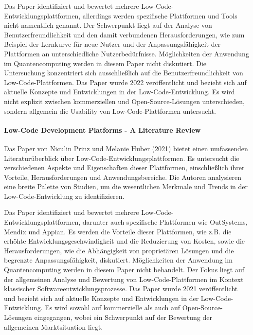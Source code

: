Das Paper identifiziert und bewertet mehrere Low-Code-Entwicklungsplattformen, allerdings werden spezifische Plattformen 
und Tools nicht namentlich genannt. Der Schwerpunkt liegt auf der Analyse von Benutzerfreundlichkeit und den damit 
verbundenen Herausforderungen, wie zum Beispiel der Lernkurve für neue Nutzer und der Anpassungsfähigkeit der 
Plattformen an unterschiedliche Nutzerbedürfnisse. 
Möglichkeiten der Anwendung im Quantencomputing werden in diesem Paper nicht diskutiert. 
Die Untersuchung konzentriert sich ausschließlich auf die Benutzerfreundlichkeit von Low-Code-Plattformen. 
Das Paper wurde 2022 veröffentlicht und bezieht sich auf aktuelle Konzepte und Entwicklungen in der Low-Code-Entwicklung. 
Es wird nicht explizit zwischen kommerziellen und Open-Source-Lösungen unterschieden, 
sondern allgemein die Usability von Low-Code-Plattformen untersucht.

\paragraph{Low-Code Development Platforms - A Literature Review}

Das Paper von Niculin Prinz und Melanie Huber (2021) bietet einen umfassenden Literaturüberblick über Low-Code-Entwicklungsplattformen. 
Es untersucht die verschiedenen Aspekte und Eigenschaften dieser Plattformen, einschließlich ihrer Vorteile, Herausforderungen 
und Anwendungsbereiche. Die Autoren analysieren eine breite Palette von Studien, um die wesentlichen Merkmale und Trends 
in der Low-Code-Entwicklung zu identifizieren.

Das Paper identifiziert und bewertet mehrere Low-Code-Entwicklungsplattformen, darunter auch spezifische Plattformen wie 
OutSystems, Mendix und Appian. Es werden die Vorteile dieser Plattformen, wie z.B. die erhöhte Entwicklungsgeschwindigkeit und 
die Reduzierung von Kosten, sowie die Herausforderungen, wie die Abhängigkeit von proprietären Lösungen und die begrenzte 
Anpassungsfähigkeit, diskutiert. Möglichkeiten der Anwendung im Quantencomputing werden in diesem Paper nicht behandelt. 
Der Fokus liegt auf der allgemeinen Analyse und Bewertung von Low-Code-Plattformen im Kontext 
klassischer Softwareentwicklungsprozesse. Das Paper wurde 2021 veröffentlicht und 
bezieht sich auf aktuelle Konzepte und Entwicklungen in der Low-Code-Entwicklung. Es wird sowohl auf kommerzielle als 
auch auf Open-Source-Lösungen eingegangen, wobei ein Schwerpunkt auf der Bewertung der allgemeinen Marktsituation liegt.

